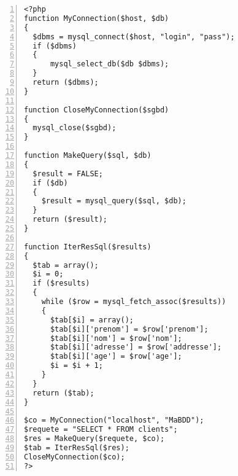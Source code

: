 \documentclass[11pt,a4paper]{article}
\begin{document}
\lstset{language=php}
\begin{lstlisting}[frame=single,numbers=left]
<?php
function MyConnection($host, $db)
{
  $dbms = mysql_connect($host, "login", "pass");
  if ($dbms)
  {
      mysql_select_db($db $dbms);
  }
  return ($dbms);
}

function CloseMyConnection($sgbd)
{
  mysql_close($sgbd);
}

function MakeQuery($sql, $db)
{
  $result = FALSE;
  if ($db)
  {
    $result = mysql_query($sql, $db);
  }
  return ($result);
}

function IterResSql($results)
{
  $tab = array();
  $i = 0;
  if ($results)
  {
    while ($row = mysql_fetch_assoc($results))
    {
      $tab[$i] = array();
      $tab[$i]['prenom'] = $row['prenom'];
      $tab[$i]['nom'] = $row['nom'];
      $tab[$i]['adresse'] = $row['addresse'];
      $tab[$i]['age'] = $row['age'];
      $i = $i + 1;
    }
  }
  return ($tab);
}

$co = MyConnection("localhost", "MaBDD");
$requete = "SELECT * FROM clients";
$res = MakeQuery($requete, $co);
$tab = IterResSql($res);
CloseMyConnection($co);
?>
\end{lstlisting}

\bigskip
\end{document}
